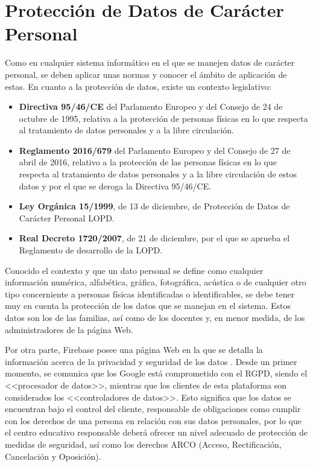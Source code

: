 \chapter{Protección de Datos de Carácter Personal}
\label{chap:lopd}
Como en cualquier sistema informático en el que se manejen datos de carácter personal, se deben aplicar unas normas y conocer el ámbito de aplicación de estas.  En cuanto a la protección de datos, existe un contexto legislativo:

\begin{itemize}
	\item \textbf{Directiva 95/46/CE} del Parlamento Europeo y del Consejo de 24 de octubre de 1995, relativa a la protección de personas físicas en lo que respecta al tratamiento de datos personales y a la libre circulación.
	\item \textbf{Reglamento 2016/679} del Parlamento Europeo y del Consejo de 27 de abril de 2016, relativo a la protección de las personas físicas en lo que respecta al tratamiento de datos personales y a la libre circulación de estos datos y por el que se deroga la Directiva 95/46/CE.
	\item \textbf{Ley Orgánica 15/1999}, de 13 de diciembre, de Protección de Datos de Carácter Personal \acf{LOPD}.
	\item \textbf{Real Decreto 1720/2007}, de 21 de diciembre, por el que se aprueba el Reglamento de desarrollo de la \acs{LOPD}.
\end{itemize}

Conocido el contexto y que un dato personal se define como cualquier información numérica, alfabética, gráfica, fotográfica, acústica o de cualquier otro tipo concerniente a personas físicas identificadas o identificables, se debe tener muy en cuenta la protección de los datos que se manejan en el sistema. Estos datos son los de las familias, así como de los docentes y, en menor medida, de los administradores de la página Web.

Por otra parte, Firebase posee una página Web en la que se detalla la información acerca de la privacidad y seguridad de los datos \cite{Firebase2018}. Desde un primer momento, se comunica que los Google está comprometido con el \acs{RGPD}, siendo el <<procesador de datos>>, mientras que los clientes de esta plataforma son considerados los <<controladores de datos>>. Esto significa que los datos se encuentran bajo el control del cliente, responsable de obligaciones como cumplir con los derechos de una persona en relación con sus datos personales, por lo que el centro educativo responsable deberá ofrecer un nivel adecuado de protección de medidas de seguridad, así como los derechos ARCO (Acceso, Rectificación, Cancelación y Oposición).